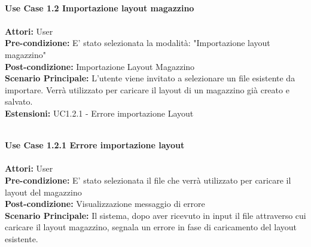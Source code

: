 \Large\textbf{}\\
\Large\textbf{Use Case 1.2 Importazione layout magazzino} \\
\vspace{0.5cm}
\large\textbf{} \\
\textbf{Attori:} User\\
\textbf{Pre-condizione:} E' stato selezionata la modalità: "Importazione layout magazzino" \\
\textbf{Post-condizione: } Importazione Layout Magazzino\\
\textbf{Scenario Principale:}  L'utente viene invitato a selezionare un file esistente da importare. Verrà utilizzato per caricare il layout di un magazzino già creato e salvato.\\
\textbf{Estensioni: } UC1.2.1 - Errore importazione Layout\\
\vspace{0.5cm}

\Large\textbf{}\\
\Large\textbf{Use Case 1.2.1 Errore importazione layout} \\
\vspace{0.5cm}
\large\textbf{} \\
\textbf{Attori:} User\\
\textbf{Pre-condizione:} E' stato selezionata il file che verrà utilizzato per caricare il layout del magazzino \\
\textbf{Post-condizione: } Visualizzazione messaggio di errore\\
\textbf{Scenario Principale:}  Il sistema, dopo aver ricevuto in input il file attraverso cui caricare il layout magazzino, segnala un errore in fase di caricamento del layout esistente.\\
\vspace{0.5cm}

